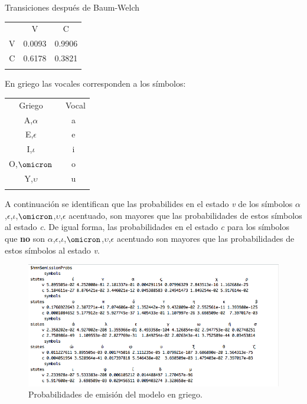 \documentclass[]{article}
\begin{document}
Transiciones después de Baum-Welch

\begin{longtable}[c]{@{}ccc@{}}
\toprule\addlinespace
& V & C
\\\addlinespace
\midrule\endhead
V & 0.0093 & 0.9906
\\\addlinespace
C & 0.6178 & 0.3821
\\\addlinespace
\bottomrule
\end{longtable}

En griego las vocales corresponden a los símbolos:

\begin{longtable}[c]{@{}cc@{}}
\toprule\addlinespace
Griego & ~Vocal
\\\addlinespace
\midrule\endhead
A,$\alpha$ & a
\\\addlinespace
E,$\epsilon$ & e
\\\addlinespace
I,$\iota$ & i
\\\addlinespace
O,$\omicron$ & o
\\\addlinespace
Y,$\upsilon$ & u
\\\addlinespace
\bottomrule
\end{longtable}

A continuación se identifican que las probabilides en el estado \emph{v}
de los símbolos
$\alpha$,$\epsilon$,$\iota$,$\omicron$,$\upsilon$,$\epsilon$ acentuado,
son mayores que las probabilidades de estos símbolos al estado \emph{c}.
De igual forma, las probabilidades en el estado \emph{c} para los
símbolos que \textbf{no} son
$\alpha$,$\epsilon$,$\iota$,$\omicron$,$\upsilon$,$\epsilon$ acentuado
son mayores que las probabilidades de estos símbolos al estado \emph{v}.

\begin{figure}[htbp]
\centering
\includegraphics{salida_vocales_griego.png}
\caption{Probabilidades de emisión del modelo en griego.}
\end{figure}
\end{document}
